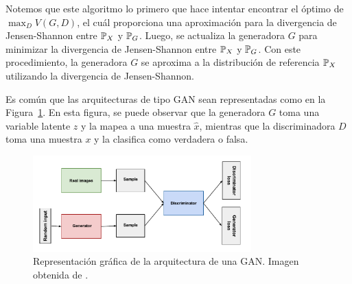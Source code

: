 {{\begin{remark}
    Notemos que este algoritmo lo primero que hace intentar encontrar el óptimo de $\max_D V(G, D)$, el cuál proporciona una aproximación para la divergencia de Jensen-Shannon entre $\Prob_X$ y $\Prob_G$. Luego, se actualiza la generadora $G$ para minimizar la divergencia de Jensen-Shannon entre $\Prob_X$ y $\Prob_G$. Con este procedimiento, la generadora $G$ se aproxima a la distribución de referencia $\Prob_X$ utilizando la divergencia de Jensen-Shannon.
\end{remark}

Es común que las arquitecturas de tipo GAN sean representadas como en la Figura~\ref{fig:gan-diagram}. En esta figura, se puede observar que la generadora $G$ toma una variable latente $z$ y la mapea a una muestra $\hat x$, mientras que la discriminadora $D$ toma una muestra $x$ y la clasifica como verdadera o falsa.

\begin{figure}[htbp]
    \centering
    \includegraphics[width=0.75\textwidth]{img/gan/gan_diagram.pdf}
    \caption{Representación gráfica de la arquitectura de una GAN. Imagen obtenida de \cite{googlegan}.}
    \label{fig:gan-diagram}
\end{figure}















}  %



}  %
